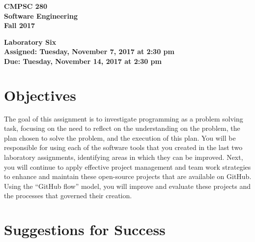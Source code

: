 \documentclass[11pt]{article}
\newcommand{\assignmentduedate}{November 14}
\newcommand{\assignmentassignedate}{November 7}
\newcommand{\assignmentnumber}{Six}
\newcommand{\labyear}{2017}
\newcommand{\labday}{Tuesday}
\newcommand{\labtime}{2:30 pm}
\newcommand{\assigneddate}{Assigned: \labday, \assignmentassignedate, \labyear{} at \labtime{}}
\newcommand{\duedate}{Due: \labday, \assignmentduedate, \labyear{} at \labtime{}}
\newcommand{\labtitle}[1]
{
  \begin{center}
    \begin{center}
      \bf
      CMPSC 280\\Software Engineering\\
      Fall 2017\\
      \medskip
    \end{center}
    \bf
    #1
  \end{center}
}
\begin{document}
\thispagestyle{empty}

\labtitle{Laboratory \assignmentnumber{} \\ \assigneddate{} \\ \duedate{}}

\section*{Objectives}

The goal of this assignment is to investigate programming as a problem solving task, focusing on the need to reflect on
the understanding on the problem, the plan chosen to solve the problem, and the execution of this plan. You will be
responsible for using each of the software tools that you created in the last two laboratory assignments, identifying
areas in which they can be improved. Next, you will continue to apply effective project management and team work
strategies to enhance and maintain these open-source projects that are available on GitHub. Using the ``GitHub flow''
model, you will improve and evaluate these projects and the processes that governed their creation.

\section*{Suggestions for Success}
\end{document}
